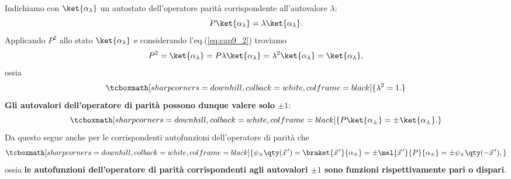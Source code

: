 Indichiamo con $\ket{\alpha_{\lambda}}$ un autostato dell'operatore parità corrispondente all'autovalore $\lambda$:
	\begin{equation}
	  P\ket{\alpha_{\lambda}} = \lambda\ket{\alpha_{\lambda}} .
	\end{equation}
Applicando $P^2$ allo stato $\ket{\alpha_{\lambda}}$ e considerando l'eq.(\ref{eq:cap9_2}) troviamo
	\begin{equation}
	  P^2 = \ket{\alpha_{\lambda}} = P\lambda\ket{\alpha_{\lambda}} = \lambda^2\ket{\alpha_{\lambda}} = \ket{\alpha_{\lambda}} ,
	\end{equation}
ossia
	\begin{equation}
		\tcboxmath[sharp corners=downhill, colback=white, colframe=black]{
			\lambda^2 = 1 .
			}
	\end{equation}
\textbf{Gli autovalori dell'operatore di parità possono dunque valere solo $\pm1$}:
	\begin{equation}
		\tcboxmath[sharp corners=downhill, colback=white, colframe=black]{
			P\ket{\alpha_{\pm}} = \pm\ket{\alpha_{\pm}} .
			}
	\end{equation}
Da questo segue anche per le corrispondenti autofunzioni dell'operatore di parità che
	\begin{equation}
		\tcboxmath[sharp corners=downhill, colback=white, colframe=black]{
			\psi_{\pm}\qty(\vec{x}^{\, \prime}) = \braket{\vec{x}^{\, \prime}}{\alpha_{\pm}} = \pm\mel{\vec{x}^{\, \prime}}{P}{\alpha_{\pm}} = \pm\psi_{\pm}\qty(-\vec{x}^{\, \prime}) ,
			}
	\end{equation}
ossia \textbf{le autofunzioni dell'operatore di parità corrispondenti agli autovalori $\pm1$ sono funzioni rispettivamente pari o dispari}.\\

